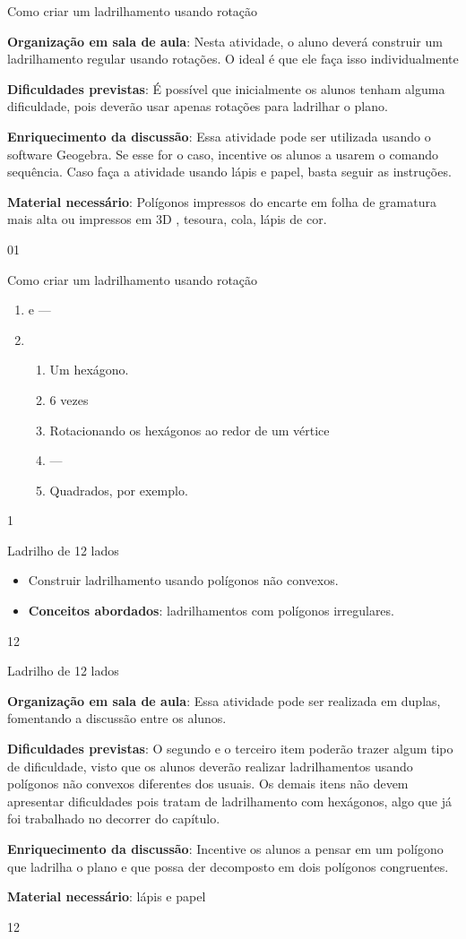 \begin{sugestions}{Como criar um ladrilhamento usando rotação}
{
	\textbf{Organização em sala de aula}: Nesta atividade, o aluno deverá construir um ladrilhamento regular usando rotações. O ideal é que ele faça isso individualmente

	\textbf{Dificuldades previstas}: É possível que inicialmente os alunos tenham alguma dificuldade, pois deverão usar apenas rotações para ladrilhar o plano.

	\textbf{Enriquecimento da discussão}: Essa atividade pode ser utilizada usando o software Geogebra. Se esse for o caso, incentive os alunos a usarem o comando sequência.
	Caso faça a atividade usando lápis e papel, basta seguir as instruções.

	\textbf{Material necessário}: Polígonos impressos do encarte em folha de gramatura mais alta ou impressos em 3D , tesoura, cola, lápis de cor.
}{0}{1}
\end{sugestions}
\begin{answer}{Como criar um ladrilhamento usando rotação}
{
	\begin{enumerate}
	\item {} e  ---
	\setcounter{enumi}{3}
	\item 
	\begin{enumerate}
	\item Um hexágono.
	\item 6 vezes
	\item Rotacionando os hexágonos ao redor de um vértice
	\item ---
	\item Quadrados, por exemplo.
	\end{enumerate}
	\end{enumerate}
}{1}
\end{answer}
\begin{objectives}{Ladrilho de 12 lados}
{
	\begin{itemize}
	\item Construir ladrilhamento usando polígonos não convexos.
	\item \textbf{Conceitos abordados}: ladrilhamentos com polígonos irregulares.
	\end{itemize}
}{1}{2}
\end{objectives}
\begin{sugestions}{Ladrilho de 12 lados}
{
	\textbf{Organização em sala de aula}: Essa atividade pode ser realizada em duplas, fomentando a discussão entre os alunos. 

	\textbf{Dificuldades previstas}: O segundo e o terceiro item poderão trazer algum tipo de dificuldade, visto que os alunos deverão realizar ladrilhamentos usando polígonos não convexos diferentes dos usuais. Os demais itens não devem apresentar dificuldades pois tratam de ladrilhamento com hexágonos, algo que já foi trabalhado no decorrer do capítulo.

	\textbf{Enriquecimento da discussão}: Incentive os alunos a pensar em um polígono que ladrilha o plano e que possa der decomposto em dois polígonos congruentes. 

	\textbf{Material necessário}: lápis e papel
}{1}{2}
\end{sugestions}

